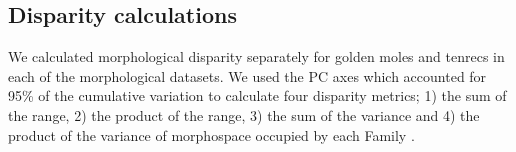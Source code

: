 \documentclass[12pt,a4paper]{article}
\begin{document}

	
\subsection{Disparity calculations}

	We calculated morphological disparity separately for golden moles and tenrecs in each of the morphological datasets. We used the PC axes which accounted for 95\% of the cumulative variation to calculate four disparity metrics; 1) the sum of the range, 2) the product of the range, 3) the sum of the variance and 4) the product of the variance of morphospace occupied by each Family \citep{Brusatte2008, Foth2012, Ruta2013}. 
\end{document}
